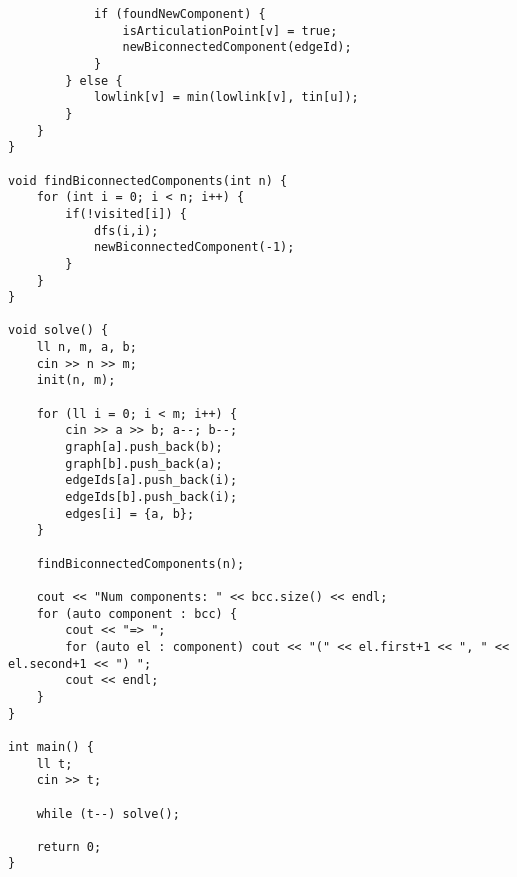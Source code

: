 \documentclass[landscape,twocolumn,10pt,a4paper]{article}
\begin{document}
\begin{verbatim}
            if (foundNewComponent) {
                isArticulationPoint[v] = true;
                newBiconnectedComponent(edgeId);
            }
        } else {
            lowlink[v] = min(lowlink[v], tin[u]);
        }
    }
}

void findBiconnectedComponents(int n) {
    for (int i = 0; i < n; i++) {
        if(!visited[i]) {
            dfs(i,i);
            newBiconnectedComponent(-1);
        }
    }
}

void solve() {
    ll n, m, a, b;
    cin >> n >> m;
    init(n, m);

    for (ll i = 0; i < m; i++) {
        cin >> a >> b; a--; b--;
        graph[a].push_back(b);
        graph[b].push_back(a);
        edgeIds[a].push_back(i);
        edgeIds[b].push_back(i);
        edges[i] = {a, b};
    }

    findBiconnectedComponents(n);

    cout << "Num components: " << bcc.size() << endl; 
    for (auto component : bcc) {
        cout << "=> ";
        for (auto el : component) cout << "(" << el.first+1 << ", " << el.second+1 << ") ";
        cout << endl;
    }       
}

int main() {
    ll t;
    cin >> t;

    while (t--) solve();

    return 0;
}\end{verbatim}
\end{document}
